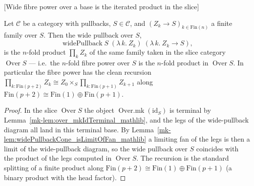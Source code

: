 \begin{lemma}

[Wide fibre power over a base is the iterated product in the slice]
  \label{mk-lem:widePullback_overX_eq_prod}

  Let \(\mathcal{C}\) be a category with pullbacks, \(S \in \mathcal{C}\), and
  \((Z_k \to S)_{k \in \mathrm{Fin}(n)}\) a finite family over \(S\). Then the wide pullback over
  \(S\),
  \[
    \operatorname{widePullback} S\;(\lambda\,k.\ Z_k)\;(\lambda\,k.\ Z_k \to S),
  \]
  is the \(n\)-fold product \(\prod_{k} Z_k\) of the same family taken in the slice category
  \(\operatorname{Over} S\) --- i.e.\ the \(n\)-fold fibre power over \(S\) is the \(n\)-fold product
  in \(\operatorname{Over} S\). In particular the fibre power has the clean recursion
  \(\prod_{k : \mathrm{Fin}(p+2)} Z_k \cong Z_0 \times_S \prod_{k : \mathrm{Fin}(p+1)} Z_{k+1}\)
  along \(\mathrm{Fin}(p+2) \cong \mathrm{Fin}(1) \oplus \mathrm{Fin}(p+1)\).
\end{lemma}
\begin{proof}
  In the slice \(\operatorname{Over} S\) the object \(\operatorname{Over.mk}(\mathrm{id}_S)\) is
  terminal by Lemma~\ref{mk-lem:over_mkIdTerminal_mathlib}, and the legs of the wide-pullback diagram
  all land in this terminal base. By Lemma~\ref{mk-lem:widePullbackCone_isLimitOfFan_mathlib} a
  limiting fan of the legs is then a limit of the wide-pullback diagram, so the wide pullback over
  \(S\) coincides with the product of the legs computed in \(\operatorname{Over} S\). The recursion
  is the standard splitting of a finite product along \(\mathrm{Fin}(p+2) \cong \mathrm{Fin}(1)
  \oplus \mathrm{Fin}(p+1)\) (a binary product with the head factor).
\end{proof}

